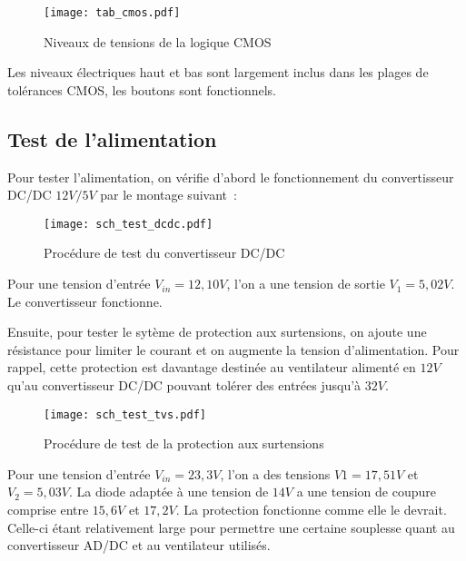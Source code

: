 \begin{figure}[H]
    \centering
	\texttt{[image: tab\_cmos.pdf]}
    \decoRule
    \caption[
    Niveaux de tensions de la logique CMOS]{
    Niveaux de tensions de la logique CMOS}
    \label{fig:Niveaux de tensions de la logique CMOS}
	\end{figure}

\vspace{1cm}

Les niveaux électriques haut et bas sont largement inclus dans les plages de tolérances CMOS, les boutons sont fonctionnels.

\subsection{Test de l'alimentation} %

Pour tester l'alimentation, on vérifie d'abord le fonctionnement du convertisseur DC/DC $12V/5V$ par le montage suivant~:

\begin{figure}[H]
    \centering
    \texttt{[image: sch\_test\_dcdc.pdf]}
    \decoRule
    \caption[
    Procédure de test du convertisseur DC/DC]{
    Procédure de test du convertisseur DC/DC}
    \label{fig:Procédure de test du convertisseur DC/DC}
	\end{figure}

\vspace{1cm}

Pour une tension d'entrée $V_{in}=12,10V$, l'on a une tension de sortie $V_{1}=5,02V$. Le convertisseur fonctionne.

\vspace{1cm}

Ensuite, pour tester le sytème de protection aux surtensions, on ajoute une résistance pour limiter le courant et on augmente la tension d'alimentation. Pour rappel, cette protection est davantage destinée au ventilateur alimenté en $12V$ qu'au convertisseur DC/DC pouvant tolérer des entrées jusqu'à $32V$.

\begin{figure}[H]
    \centering
    \texttt{[image: sch\_test\_tvs.pdf]}
    \decoRule
    \caption[
    Procédure de test de la protection aux surtensions]{
    Procédure de test de la protection aux surtensions}
    \label{fig:Procédure de test de la protection aux surtensions}
	\end{figure}

\vspace{1cm}

Pour une tension d'entrée $V_{in}=23,3V$, l'on a des tensions $V{1}=17,51V$ et $V_{2}=5,03V$. La diode adaptée à une tension de $14V$ a une tension de coupure comprise entre $15,6V$ et $17,2V$. La protection fonctionne comme elle le devrait. Celle-ci étant relativement large pour permettre une certaine souplesse quant au convertisseur AD/DC et au ventilateur utilisés.

